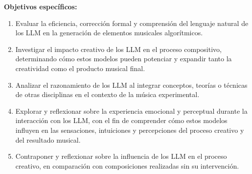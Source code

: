 \textbf{Objetivos específicos:}
\begin{enumerate}[label=\alph*)]
\item Evaluar la eficiencia, corrección formal y comprensión del lenguaje natural de los LLM en la generación de elementos musicales algorítmicos.
\item Investigar el impacto creativo de los LLM en el proceso compositivo, determinando cómo estos modelos pueden potenciar y expandir tanto la creatividad como el producto musical final.
\item Analizar el razonamiento de los LLM al integrar conceptos, teorías o técnicas de otras disciplinas en el contexto de la música experimental.
\item Explorar y reflexionar sobre la experiencia emocional y perceptual durante la interacción con los LLM, con el fin de comprender cómo estos modelos influyen en las sensaciones, intuiciones y percepciones del proceso creativo y del resultado musical.
\item Contraponer y reflexionar sobre la influencia de los LLM en el proceso creativo, en comparación con composiciones realizadas sin su intervención.
\end{enumerate}


